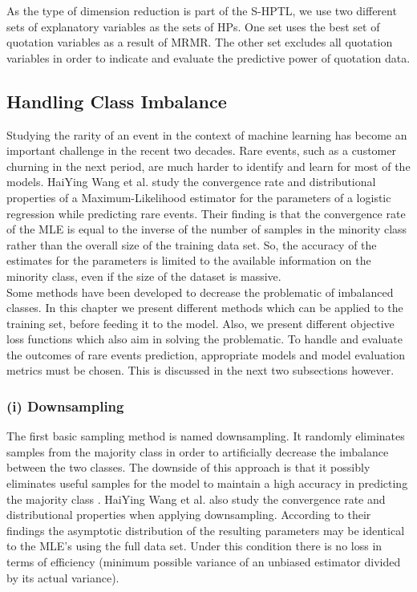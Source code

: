 \documentclass[12pt,titlepage]{article}
\begin{document}
As the type of dimension reduction is part of the S-HPTL, we use two different sets of explanatory variables as the sets of HPs. One set uses the best set of quotation variables as a result of MRMR. The other set excludes all quotation variables in order to indicate and evaluate the predictive power of quotation data. \\

\subsection{Handling Class Imbalance} \par

Studying the rarity of an event in the context of machine learning has become an important challenge in the recent two decades. Rare events, such as a customer churning in the next period, are much harder to identify and learn for most of the models. HaiYing Wang et al. \cite{convergence_rareevents} study the convergence rate and distributional properties of a Maximum-Likelihood estimator for the parameters of a logistic regression while predicting rare events. Their finding is that the convergence rate of the MLE is equal to the inverse of the number of samples in the minority class rather than the overall size of the training data set. So, the accuracy of the estimates for the parameters is limited to the available information on the minority class, even if the size of the dataset is massive. \\
Some methods have been developed to decrease the problematic of imbalanced classes. In this chapter we present different methods which can be applied to the training set, before feeding it to the model. Also, we present different objective loss functions which also aim in solving the problematic. To handle and evaluate the outcomes
of rare events prediction, appropriate models and model evaluation metrics must be chosen. This is discussed in the next two subsections however. \\

\subsubsection*{(i) Downsampling}

The first basic sampling method is named downsampling. It randomly eliminates samples from the majority class in order to artificially decrease the imbalance between the two classes. The downside of this approach is that it possibly eliminates useful samples for the model to maintain a high accuracy in predicting the majority class \cite{mining_rarity}. HaiYing Wang et al. also study the convergence rate and distributional properties when applying downsampling. According to their findings the asymptotic distribution of the resulting parameters may be identical to the MLE's using the full data set. Under this condition there is no loss in terms of efficiency (minimum possible variance of an unbiased estimator divided by its actual variance). \\
\end{document}
